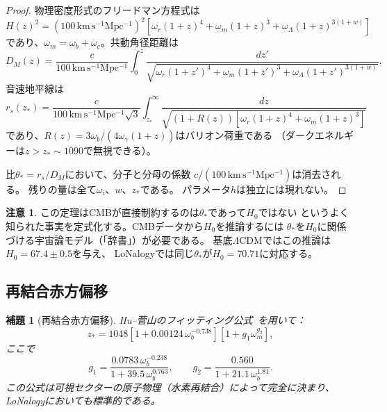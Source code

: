 \documentclass[12pt]{article}
\theoremstyle{plain}
\newtheorem{lemma}[theorem]{補題}
\theoremstyle{definition}
\newtheorem{remark}[theorem]{注意}
\numberwithin{equation}{section}
\begin{document}
\begin{proof}
物理密度形式のフリードマン方程式は
\begin{equation}
H(z)^2 = (100\,\mathrm{km\,s^{-1}Mpc^{-1}})^2
\left[\omega_r(1+z)^4+\omega_m(1+z)^3+\omega_\Lambda(1+z)^{3(1+w)}\right]
\end{equation}
であり、$\omega_m=\omega_b+\omega_c$。共動角径距離は
\begin{equation}
D_M(z) = \frac{c}{100\,\mathrm{km\,s^{-1}Mpc^{-1}}}
\int_0^z\frac{dz'}{\sqrt{\omega_r(1+z')^4+\omega_m(1+z')^3+\omega_\Lambda(1+z')^{3(1+w)}}}.
\end{equation}
音速地平線は
\begin{equation}
r_s(z_*) = \frac{c}{100\,\mathrm{km\,s^{-1}Mpc^{-1}}\sqrt{3}}
\int_{z_*}^{\infty}\frac{dz}{\sqrt{(1+R(z))[\omega_r(1+z)^4+\omega_m(1+z)^3]}}
\end{equation}
であり、$R(z)=3\omega_b/(4\omega_\gamma(1+z))$はバリオン荷重である
（ダークエネルギーは$z>z_*\sim1090$で無視できる）。

比$\theta_*=r_s/D_M$において、分子と分母の係数
$c/(100\,\mathrm{km\,s^{-1}Mpc^{-1}})$は消去される。
残りの量は全て$\omega_i$、$w$、$z_*$である。
パラメータ$h$は独立には現れない。
\end{proof}

\begin{remark}
この定理はCMBが直接制約するのは$\theta_*$であって$H_0$ではない
というよく知られた事実を定式化する。CMBデータから$H_0$を推論するには
$\theta_*$を$H_0$に関係づける宇宙論モデル（「辞書」）が必要である。
基底$\Lambda$CDMではこの推論は$H_0=67.4\pm0.5$を与え、
LoNalogyでは同じ$\theta_*$が$H_0=70.71$に対応する。
\end{remark}


\subsection{再結合赤方偏移}

\begin{lemma}[再結合赤方偏移]\label{lem:zstar}
Hu--菅山のフィッティング公式~\cite{HuSugiyama1996}を用いて：
\begin{equation}
z_* = 1048\left[1+0.00124\,\omega_b^{-0.738}\right]\left[1+g_1\omega_m^{g_2}\right],
\end{equation}
ここで
\begin{equation}
g_1 = \frac{0.0783\,\omega_b^{-0.238}}{1+39.5\,\omega_b^{0.763}},
\qquad
g_2 = \frac{0.560}{1+21.1\,\omega_b^{1.81}}.
\end{equation}
この公式は可視セクターの原子物理（水素再結合）によって完全に決まり、
LoNalogyにおいても標準的である。
\end{lemma}
\end{document}
